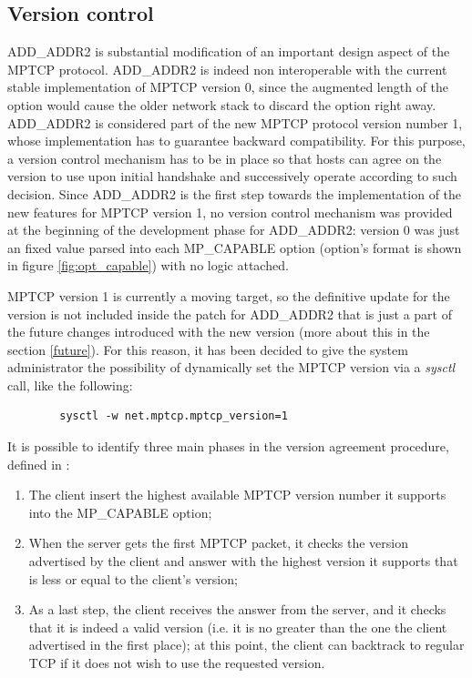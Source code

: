 \subsection{Version control}
\label{retrocomp}
ADD\_ADDR2 is substantial modification of an important design aspect of the MPTCP protocol. ADD\_ADDR2 is indeed non interoperable with the current stable implementation of MPTCP version 0, since the augmented length of the option would cause the older network stack to discard the option right away.
ADD\_ADDR2 is considered part of the new MPTCP protocol version number 1, whose implementation has to guarantee backward compatibility. For this purpose, a version control mechanism has to be in place so that hosts can agree on the version to use upon initial handshake and successively operate according to such decision. Since ADD\_ADDR2 is the first step towards the implementation of the new features for MPTCP version 1, no version control mechanism was provided at the beginning of the development phase for ADD\_ADDR2: version 0 was just an fixed value parsed into each MP\_CAPABLE option (option's format is shown in figure \ref{fig:opt_capable}) with no logic attached.

MPTCP version 1 is currently a moving target, so the definitive update for the version is not included inside the patch for ADD\_ADDR2 that is just a part of the future changes introduced with the new version (more about this in the section \ref{future}). For this reason, it has been decided to give the system administrator the possibility of dynamically set the MPTCP version via a \textit{sysctl} call, like the following:

\begin{verbatim}
        sysctl -w net.mptcp.mptcp_version=1
\end{verbatim}

It is possible to identify three main phases in the version agreement procedure, defined in :

\begin{enumerate}
  \item The client insert the highest available MPTCP version number it supports into the MP\_CAPABLE option;
  \item When the server gets the first MPTCP packet, it checks the version advertised by the client and answer with the highest version it supports that is less or equal to the client's version;
  \item As a last step, the client receives the answer from the server, and it checks that it is indeed a valid version (i.e. it is no greater than the one the client advertised in the first place); at this point, the client can backtrack to regular TCP if it does not wish to use the requested version.
\end{enumerate}


